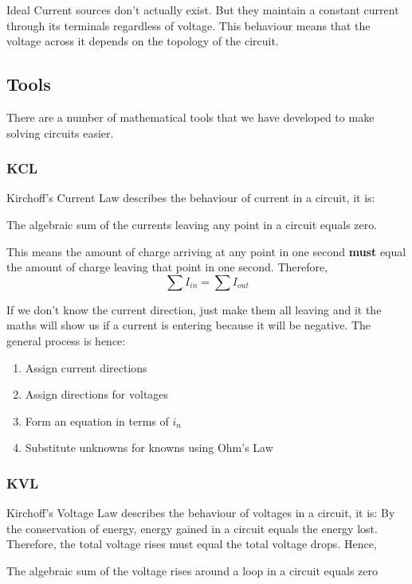 \documentclass[12pt]{article}
\begin{document}
Ideal Current sources don't actually exist.
But they maintain a constant current through its terminals regardless of voltage. 
This behaviour means that the voltage across it depends on the topology of the circuit.

\subsection{Tools}
There are a number of mathematical tools that we have developed to make solving circuits easier.

\subsubsection{KCL}
Kirchoff's Current Law describes the behaviour of current in a circuit, it is:
\begin{theorem*}
  The algebraic sum of the currents leaving any point in a circuit equals zero.
\end{theorem*}
This means the amount of charge arriving at any point in one second \textbf{must} equal the amount of charge leaving that point in one second.
Therefore,
\begin{equation*}
  \sum I_{in} = \sum I_{out}
\end{equation*}

If we don't know the current direction, just make them all leaving and it the maths will show us if a current is entering because it will be negative.
The general process is hence:

\begin{enumerate}
  \item Assign current directions 
  \item Assign directions for voltages 
  \item Form an equation in terms of $i_n$
  \item Substitute unknowns for knowns using Ohm's Law 
\end{enumerate}

\subsubsection{KVL}
Kirchoff's Voltage Law describes the behaviour of voltages in a circuit, it is:
By the conservation of energy, energy gained in a circuit equals the energy lost.
Therefore, the total voltage rises must equal the total voltage drops. Hence,

\begin{theorem*}
  The algebraic sum of the voltage rises around a loop in a circuit equals zero
\end{theorem*}
\end{document}
